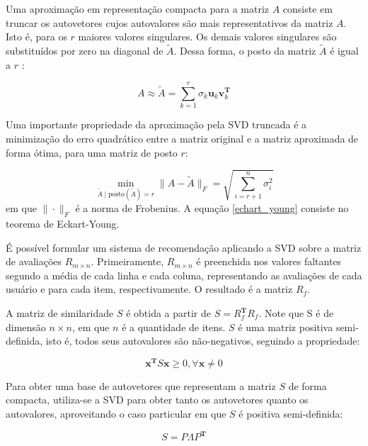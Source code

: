 Uma aproximação em representação compacta para a matriz $A$ consiste em truncar
os autovetores cujos autovalores são mais representativos da matriz $A$. Isto é,
para os $r$ maiores valores singulares. Os demais valores singulares são
substituídos por zero na diagonal de $\tilde{A}$. Dessa forma, o posto da matriz
$\tilde{A}$ é igual a $r$ \cite{brunton2022data}:

\begin{equation}
    A \approx \tilde{A} = \sum_{k=1}^{r}\sigma_k \mathbf{u}_k \mathbf{v}_k^{\mathbf{T}}
\end{equation}

Uma importante propriedade da aproximação pela SVD truncada é a minimização do
erro quadrático entre a matriz original e a matriz aproximada de forma ótima,
para uma matriz de posto $r$:

\begin{equation} \label{echart_young}
    \min_{\tilde{A} \mid \text{posto}(\tilde{A}) = r } \|A - \tilde{A}\|_F = \sqrt{\sum_{i=r+1}^{n}\sigma_i^2}
\end{equation}
em que $\| \cdot \|_F$ é a norma de Frobenius. A equação \ref{echart_young}
consiste no teorema de Eckart-Young.


É possível formular um sistema de recomendação aplicando a SVD sobre a matriz de
avaliações $R_{m \times n}$. Primeiramente, $R_{m \times n}$ é preenchida nos
valores faltantes segundo a média de cada linha e cada coluna, representando as
avaliações de cada usuário e para cada item, respectivamente. O resultado é a
matriz $R_f$.

A matriz de similaridade $S$ é obtida a partir de $S = R_f^{\mathbf{T} }R_f$.
Note que S é de dimensão $n \times n$, em que $n$ é a quantidade de itens. $S$ é
uma matriz positiva semi-definida, isto é, todos seus autovalores são
não-negativos, seguindo a propriedade:

\begin{equation}
    \mathbf{x}^{\mathbf{T}} S \mathbf{x} \geq 0, \forall \mathbf{x} \neq 0
\end{equation}

 Para obter uma base de autovetores que representam a matriz $S$ de forma
 compacta, utiliza-se a SVD para obter tanto os autovetores quanto os
 autovalores, aproveitando o caso particular em que $S$ é positiva
 semi-definida:

\begin{equation}
    S = P \Lambda P^{\mathbf{T}}
\end{equation}

